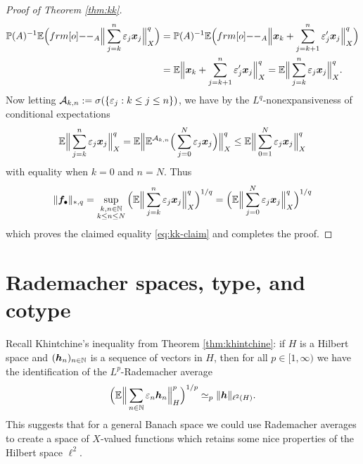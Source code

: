 \begin{proof}[Proof of Theorem \ref{thm:kk}]
\begin{equation*}
\begin{aligned}
      \P(A)^{-1} \E \Big( \1_{A} \Big\| \sum_{j=k}^{n} \varepsilon_j \mb{x}_j\Big\|_{X}^q \Big)
      &=  \P(A)^{-1} \E \Big( \1_{A} \Big\|\mb{x}_k + \sum_{j=k+1}^{n} \varepsilon_{j}^{\prime} \mb{x}_j \Big\|_{X}^{q} \Big) \\
      &=  \E \Big\|\mb{x}_k + \sum_{j=k+1}^{n} \varepsilon_{j}^{\prime} \mb{x}_j \Big\|_{X}^{q} 
      =  \E  \Big\|\sum_{j=k}^{n} \varepsilon_{j} \mb{x}_j \Big\|_{X}^{q}. \\
    \end{aligned}
  \end{equation*}
  Now letting $\mathcal{A}_{k,n} := \sigma(\{\varepsilon_j : k \leq j \leq n\})$, we have by the $L^q$-nonexpansiveness of conditional expectations
  \begin{equation*}
    \mathbb{E} \Big\|\sum_{j=k}^{n} \varepsilon_{j} \bm{x}_j \Big\|_{X}^{q}
    = \mathbb{E} \Big\|\mathbb{E}^{\mathcal{A}_{k,n}} \Big(\sum_{j=0}^{N} \varepsilon_{j} \bm{x}_j \Big)\Big\|_{X}^{q}
    \leq \mathbb{E} \Big\|\sum_{0=1}^{N} \varepsilon_{j} \bm{x}_j \Big\|_{X}^{q}
  \end{equation*}
  with equality when $k=0$ and $n=N$.
  Thus
  \begin{equation*}
    \|\bm{f}_{\bullet}\|_{*,q} =  \sup_{\substack{k,n \in \mathbb{N} \\ k \leq n \leq N}}  \Big(\mathbb{E}  \Big\|\sum_{j=k}^{n} \varepsilon_{j} \bm{x}_j \Big\|_{X}^{q}\Big)^{1/q} = \Big(\mathbb{E}  \Big\|\sum_{j=0}^{N} \varepsilon_{j} \bm{x}_j \Big\|_{X}^{q}\Big)^{1/q}
  \end{equation*}
  which proves the claimed equality \eqref{eq:kk-claim} and completes the proof. 
\end{proof}

\section{Rademacher spaces, type, and cotype}\label{sec:rademacher-spaces}

Recall Khintchine's inequality from Theorem \ref{thm:khintchine}: if $H$ is a Hilbert space and $(\bm{h}_{n})_{n \in \mathbb{N}}$ is a sequence of vectors in $H$, then for all $p \in [1,\infty)$ we have the identification of the $L^p$-Rademacher average
\begin{equation*}
  \Big( \mathbb{E} \Big\| \sum_{n \in \mathbb{N}} \varepsilon_{n} \bm{h}_{n} \Big\|_{H}^{p} \Big)^{1/p} \simeq_{p} \|\bm{h}\|_{\ell^2(H)}.
\end{equation*}
This suggests that for a general Banach space we could use Rademacher averages to create a space of $X$-valued functions which retains some nice properties of the Hilbert space $\ell^2$.

